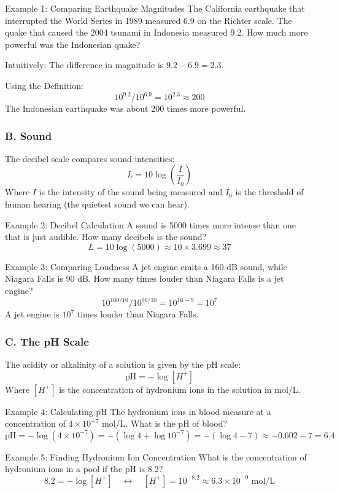 \documentclass{article}
\begin{document}
\begin{examplebox}{Example 1: Comparing Earthquake Magnitudes}
The California earthquake that interrupted the World Series in 1989 measured 6.9 on the Richter scale. The quake that caused the 2004 tsunami in Indonesia measured 9.2. How much more powerful was the Indonesian quake?

Intuitively:
The difference in magnitude is \( 9.2 - 6.9 = 2.3 \).

Using the Definition:
\[
10^{9.2} / 10^{6.9} = 10^{2.3} \approx 200
\]
The Indonesian earthquake was about 200 times more powerful.
\end{examplebox}

\subsubsection{B. Sound}
The decibel scale compares sound intensities:
\[
L = 10 \log{\left(\frac{I}{I_0}\right)}
\]
Where \( I \) is the intensity of the sound being measured and \( I_0 \) is the threshold of human hearing (the quietest sound we can hear).

\begin{examplebox}{Example 2: Decibel Calculation}
A sound is 5000 times more intense than one that is just audible. How many decibels is the sound?
\[
L = 10 \log{(5000)} \approx 10 \times 3.699 \approx 37
\]
\end{examplebox}

\begin{examplebox}{Example 3: Comparing Loudness}
A jet engine emits a 160 dB sound, while Niagara Falls is 90 dB. How many times louder than Niagara Falls is a jet engine?
\[
10^{160/10} / 10^{90/10} = 10^{16 - 9} = 10^7
\]
A jet engine is \( 10^7 \) times louder than Niagara Falls.
\end{examplebox}

\subsubsection{C. The pH Scale}
The acidity or alkalinity of a solution is given by the pH scale:
\[
\text{pH} = -\log{[H^+]}
\]
Where \([H^+]\) is the concentration of hydronium ions in the solution in mol/L.

\begin{examplebox}{Example 4: Calculating pH}
The hydronium ions in blood measure at a concentration of \( 4 \times 10^{-7} \) mol/L. What is the pH of blood?
\[
\text{pH} = -\log{(4 \times 10^{-7})} = -(\log{4} + \log{10^{-7}}) = -(\log{4} - 7) \approx -0.602 - 7 = 6.4
\]
\end{examplebox}

\begin{examplebox}{Example 5: Finding Hydronium Ion Concentration}
What is the concentration of hydronium ions in a pool if the pH is 8.2?
\[
8.2 = -\log{[H^+]} \quad \leftrightarrow \quad [H^+] = 10^{-8.2} \approx 6.3 \times 10^{-9} \text{ mol/L}
\]
\end{examplebox}
\end{document}

